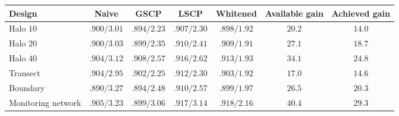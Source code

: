\begin{tabular}{lcccccc}
\toprule
Design & Naive & GSCP & LSCP & Whitened & Available gain & Achieved gain\\
\midrule
Halo $10$ & $.900/3.01$ & $.894/2.23$ & $.907/2.30$ & $.898/\mathbf{1.92}$ & $20.2$ & $14.0$\\
Halo $20$ & $.900/3.03$ & $.899/2.35$ & $.910/2.41$ & $.909/\mathbf{1.91}$ & $27.1$ & $18.7$\\
Halo $40$ & $.904/3.12$ & $.908/2.57$ & $.916/2.62$ & $.913/\mathbf{1.93}$ & $34.1$ & $24.8$\\
Transect & $.904/2.95$ & $.902/2.25$ & $.912/2.30$ & $.903/\mathbf{1.92}$ & $17.0$ & $14.6$\\
Boundary & $.890/3.27$ & $.894/2.48$ & $.910/2.57$ & $.899/\mathbf{1.97}$ & $26.5$ & $20.3$\\
Monitoring network & $.905/3.23$ & $.899/3.06$ & $.917/3.14$ & $.918/\mathbf{2.16}$ & $40.4$ & $29.3$\\
\bottomrule
\end{tabular}
